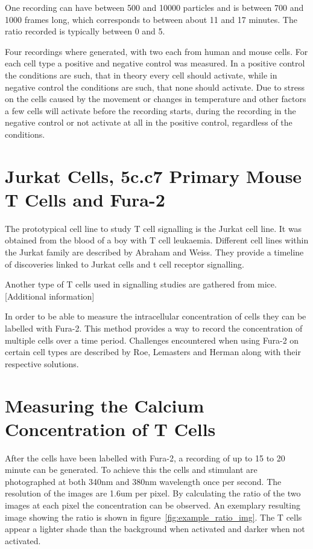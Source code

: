 
One recording can have between 500 and 10000 particles and is between 700 and 1000 frames long, which corresponds to between about 11 and 17 minutes. The ratio recorded is typically between 0 and 5.

Four recordings where generated, with two each from human and mouse cells. For each cell type a positive and negative control was measured. In a positive control the conditions are such, that in theory every cell should activate, while in negative control the conditions are such, that none should activate. Due to stress on the cells caused by the movement or changes in temperature and other factors a few cells will activate before the recording starts, during the recording in the negative control or not activate at all in the positive control, regardless of the conditions.

\section{Jurkat Cells, 5c.c7 Primary Mouse T Cells and Fura-2}

The prototypical cell line to study T cell signalling is the Jurkat cell line.\cite{morgan2023} It was obtained from the blood of a boy with T cell leukaemia.\cite{schneider1977} Different cell lines within the Jurkat family are described by Abraham and Weiss.\cite{abraham2004} They provide a timeline of discoveries linked to Jurkat cells and t cell receptor signalling.

Another type of T cells used in signalling studies are gathered from mice. [Additional information]

In order to be able to measure the intracellular \Calcium concentration of cells they can be labelled with Fura-2. This method provides a way to record the \Calcium concentration of multiple cells over a time period.\cite{martinez2017} Challenges encountered when using Fura-2 on certain cell types are described by Roe, Lemasters and Herman along with their respective solutions.\cite{roe1990}

\section{Measuring the Calcium Concentration of T Cells}

After the cells have been labelled with Fura-2, a recording of up to 15 to 20 minute can be generated. To achieve this the cells and stimulant are photographed at both 340nm and 380nm wavelength once per second. The resolution of the images are 1.6um per pixel. By calculating the ratio of the two images at each pixel the \Calcium concentration can be observed. An exemplary resulting image showing the ratio is shown in figure~\ref{fig:example_ratio_img}. The T cells appear a lighter shade than the background when activated and darker when not activated.

